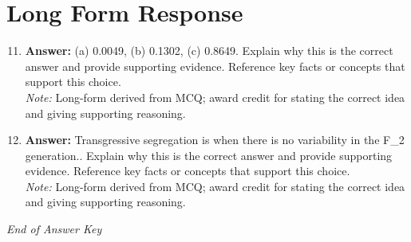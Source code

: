 \documentclass[12pt]{article}
\begin{document}
\section*{Long Form Response}
\begin{enumerate}[label=\arabic*.]
\setcounter{enumi}{10}
\item \textbf{Answer:} (a) 0.0049, (b) 0.1302, (c) 0.8649. Explain why this is the correct answer and provide supporting evidence. Reference key facts or concepts that support this choice.
\\ \textit{Note:} Long-form derived from MCQ; award credit for stating the correct idea and giving supporting reasoning.
\item \textbf{Answer:} Transgressive segregation is when there is no variability in the F\_2 generation.. Explain why this is the correct answer and provide supporting evidence. Reference key facts or concepts that support this choice.
\\ \textit{Note:} Long-form derived from MCQ; award credit for stating the correct idea and giving supporting reasoning.
\end{enumerate}

\vfill
\noindent\textit{End of Answer Key}
\end{document}
